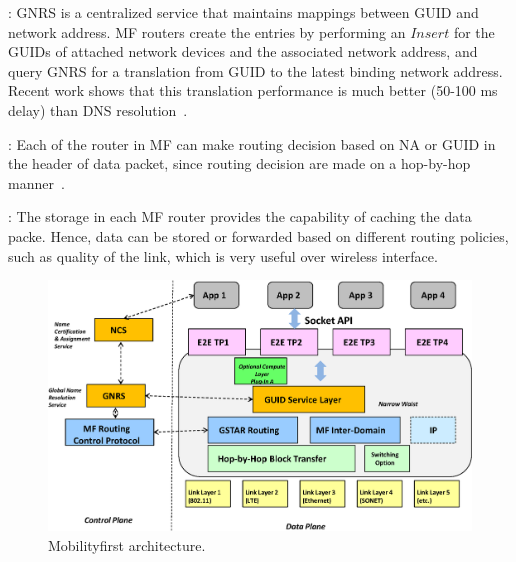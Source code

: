 \vspace{1mm}: GNRS is a centralized service that maintains mappings between GUID and network address. MF routers create the entries by performing an $Insert$ for the GUIDs of attached network devices and the associated network address, and query GNRS for a translation from GUID to the latest binding network address. Recent work shows that this translation performance is much better (50-100 ms delay) than DNS resolution~\cite{vu2012dmap}.

\vspace{1mm}: Each of the router in MF can make routing decision based on NA or GUID in the header of data packet, since routing decision are made on a hop-by-hop manner~\cite{nelson2011gstar}.

\vspace{1mm}: The storage in each MF router provides the capability of caching the data packe. Hence, data can be stored or forwarded based on different routing policies, such as quality of the link, which is very useful over wireless interface.
\begin{figure}
\centering
\includegraphics[width=\columnwidth]{figure/mf_arch.eps}
\caption{\label{fig:mf_arch}Mobilityfirst architecture.}
\end{figure}

